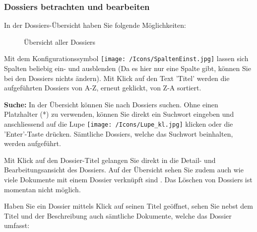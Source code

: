 \subsubsection{Dossiers betrachten und bearbeiten}

In der Dossiers-Übersicht haben Sie folgende Möglichkeiten:

\begin{figure}[H]
\caption{Übersicht aller Dossiers}
\end{figure}

Mit dem Konfigurationssymbol \texttt{[image: /Icons/SpaltenEinst.jpg]}  lassen sich Spalten beliebig ein- und ausblenden (Da es hier nur eine Spalte gibt, können Sie bei den Dossiers nichts ändern). Mit Klick auf den Text 'Titel'  werden die aufgeführten Dossiers von A-Z, erneut geklickt, von Z-A sortiert.

\vspace{\baselineskip}

\textbf{Suche:} In der Übersicht können Sie nach Dossiers suchen. Ohne einen Platzhalter (*) zu verwenden, können Sie direkt ein Suchwort eingeben und anschliessend auf die Lupe \texttt{[image: /Icons/Lupe\_kl.jpg]}  klicken oder die 'Enter'-Taste drücken. Sämtliche Dossiers, welche das Suchwort beinhalten, werden aufgeführt. \newline

Mit Klick auf den Dossier-Titel  gelangen Sie direkt in die Detail- und Bearbeitungsansicht des Dossiers. Auf der Übersicht sehen Sie zudem auch wie viele Dokumente mit einem Dossier verknüpft sind . Das Löschen von Dossiers ist momentan nicht möglich. \newline

Haben Sie ein Dossier mittels Klick auf seinen Titel  geöffnet, sehen Sie nebst dem Titel und der Beschreibung auch sämtliche Dokumente, welche das Dossier umfasst:

